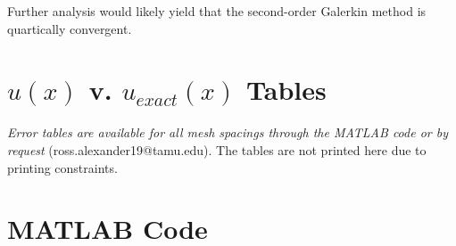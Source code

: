 \documentclass[10pt]{article}		%
\numberwithin{equation}{section}
\begin{document}
Further analysis would likely yield that the second-order Galerkin method is quartically convergent.

\newpage

\appendix

\section{$u(x)$ v. $u_{exact}(x)$ Tables}

\textit{Error tables are available for all mesh spacings through the MATLAB code or by request} (ross.alexander19@tamu.edu). The tables are not printed here due to printing constraints.

\newpage

\section{MATLAB Code}
\end{document}
